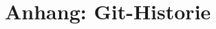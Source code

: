 \documentclass[usegeometry=true]{scrartcl}
\begin{document}


\section*{Anhang: Git-Historie}

\printbibliography
\end{document}
